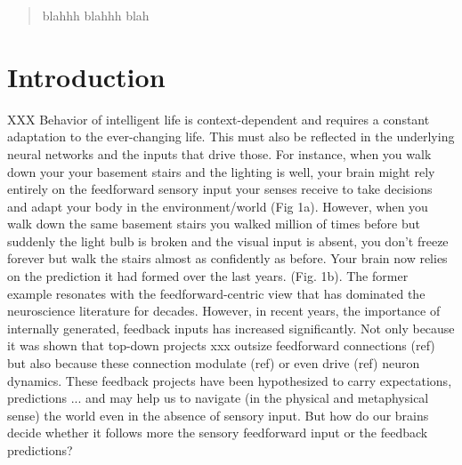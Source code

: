 \documentclass[10pt,a4paper,draft]{article}
\begin{document}
\thispagestyle{empty}

\begin{flushleft}
{\Large
\textbf{}
}

\end{flushleft}


\begin{abstract}
blahhh blahhh blah
\end{abstract}

\section*{Introduction}
%
XXX
%
Behavior of intelligent life is context-dependent and requires a constant adaptation to the ever-changing life. This must also be reflected in the underlying neural networks and the inputs that drive those. For instance, when you walk down your your basement stairs and the lighting is well, your brain might rely entirely on the feedforward sensory input your senses receive to take decisions and adapt your body in the environment/world (Fig 1a). However, when you walk down the same basement stairs you walked million of times before but suddenly the light bulb is broken and the visual input is absent, you don't freeze forever but walk the stairs almost as confidently as before. Your brain now relies on the prediction it had formed over the last years. (Fig. 1b). The former example resonates with the feedforward-centric view that has dominated the neuroscience literature for decades. However, in recent years, the importance of internally generated, feedback inputs has increased significantly. Not only because it was shown that top-down projects xxx outsize feedforward connections (ref) but also because these connection modulate (ref) or even drive (ref) neuron dynamics. These feedback projects have been hypothesized to carry expectations, predictions ... and may help us to navigate (in the physical and metaphysical sense) the world even in the absence of sensory input.  But how do our brains decide whether it follows more the sensory feedforward input or the feedback predictions?
\end{document}

